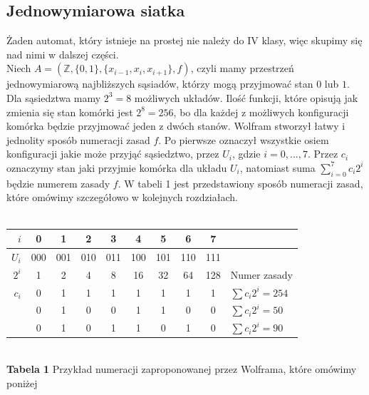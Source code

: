 \documentclass[a4paper,12pt]{article}
\begin{document}
\subsection{Jednowymiarowa siatka}
Żaden automat, który istnieje na prostej nie należy do IV klasy, więc skupimy się nad nimi w dalszej części. \\
Niech $A=( \mathbb{Z}, \{0,1\}, \{x_{i-1}, x_i, x_{i+1}\}, f)$, czyli mamy przestrzeń jednowymiarową najbliższych sąsiadów, którzy mogą przyjmować stan $0$ lub $1$. Dla sąsiedztwa mamy $2^3=8$ możliwych układów. Ilość funkcji, które opisują jak zmienia się stan komórki jest $2^8=256$, bo dla każdej z możliwych konfiguracji komórka będzie przyjmować jeden z dwóch stanów. Wolfram stworzył łatwy i jednolity sposób numeracji zasad $f$. Po pierwsze oznaczył wszystkie osiem konfiguracji jakie może przyjąć sąsiedztwo, przez $U_i$, gdzie $i=0,...,7$. Przez $c_i$ oznaczymy stan jaki przyjmie komórka dla układu $U_i$, natomiast suma $\sum_{i=0}^7 c_i2^i$ będzie numerem zasady $f$. W tabeli 1 jest przedstawiony sposób numeracji zasad, które omówimy szczegółowo w kolejnych rozdziałach.  \\\\
\begin{tabular}{|r||c|c|c|c|c|c|c|c||l|} \hline
$i$ &  0 & 1 & 2 & 3 & 4 & 5 & 6 & 7 &  \\
\hline
$U_i$ & 000 & 001 & 010 & 011 & 100 & 101 & 110 & 111 &  \\
\hline
$2^i$ & 1 & 2 & 4 & 8 & 16 & 32 & 64 & 128  & Numer zasady \\
\hline 
\hline
$c_i$ & 0 & 1 & 1 & 1 & 1 & 1 & 1 & 1 & $\sum c_i2^i = 254$ \\ 
\hline
 & 0 & 1 & 0 & 0 & 1 & 1 & 0  & 0 & $\sum c_i2^i = 50$ \\
\hline
 & 0 & 1 & 0 & 1 & 1 & 0 & 1  & 0 & $\sum c_i2^i = 90$ \\
\hline
\end{tabular}\\
\textbf{Tabela 1 } Przykład numeracji zaproponowanej przez Wolframa, które omówimy poniżej\\\\
\end{document}
